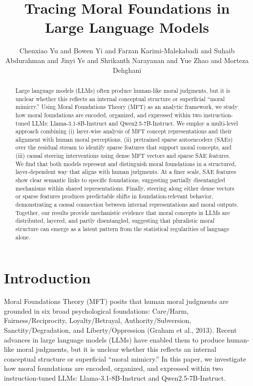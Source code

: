 \documentclass{article}
\begin{document}
\title{Tracing Moral Foundations in Large Language Models}
\author{Chenxiao Yu and Bowen Yi and Farzan Karimi-Malekabadi and Suhaib Abdurahman and Jinyi Ye and Shrikanth Narayanan and Yue Zhao and Morteza Dehghani}

\maketitle

\begin{abstract}
Large language models (LLMs) often produce human-like moral judgments, but it is unclear whether this reflects an internal conceptual structure or superficial ``moral mimicry.'' Using Moral Foundations Theory (MFT) as an analytic framework, we study how moral foundations are encoded, organized, and expressed within two instruction-tuned LLMs: Llama-3.1-8B-Instruct and Qwen2.5-7B-Instruct. We employ a multi-level approach combining (i) layer-wise analysis of MFT concept representations and their alignment with human moral perceptions, (ii) pretrained sparse autoencoders (SAEs) over the residual stream to identify sparse features that support moral concepts, and (iii) causal steering interventions using dense MFT vectors and sparse SAE features. We find that both models represent and distinguish moral foundations in a structured, layer-dependent way that aligns with human judgments. At a finer scale, SAE features show clear semantic links to specific foundations, suggesting partially disentangled mechanisms within shared representations. Finally, steering along either dense vectors or sparse features produces predictable shifts in foundation-relevant behavior, demonstrating a causal connection between internal representations and moral outputs. Together, our results provide mechanistic evidence that moral concepts in LLMs are distributed, layered, and partly disentangled, suggesting that pluralistic moral structure can emerge as a latent pattern from the statistical regularities of language alone.
\end{abstract}

\section{Introduction}
Moral Foundations Theory (MFT) posits that human moral judgments are grounded in six broad psychological foundations: Care/Harm, Fairness/Reciprocity, Loyalty/Betrayal, Authority/Subversion, Sanctity/Degradation, and Liberty/Oppression (Graham et al., 2013). Recent advances in large language models (LLMs) have enabled them to produce human-like moral judgments, but it is unclear whether this reflects an internal conceptual structure or superficial ``moral mimicry.'' In this paper, we investigate how moral foundations are encoded, organized, and expressed within two instruction-tuned LLMs: Llama-3.1-8B-Instruct and Qwen2.5-7B-Instruct.
\end{document}
